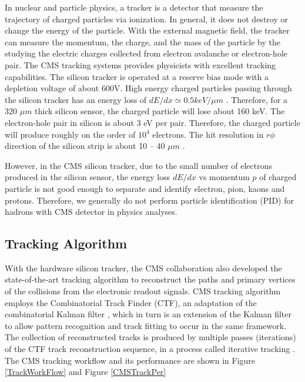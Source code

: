 In nuclear and particle physics, a tracker is a detector that measure the trajectory of charged particles via ionization. In general, it does not destroy or change the energy of the particle. With the external magnetic field, the tracker can measure the momentum, the charge, and the mass of the particle by the studying the electric charges collected from electron avalanche or electron-hole pair. The CMS tracking systems provides physicists with excellent tracking capabilities. The silicon tracker is operated at a reserve bias mode with a depletion voltage of about 600V. High energy charged particles passing through the silicon tracker has an energy loss of $dE/dx \simeq 0.5 keV/\mu m$ \cite{AlphaTheoEx}. Therefore, for a 320 $\mu m$ thick silicon sensor, the charged particle will lose about 160 keV. The electron-hole pair in silicon is about 3 eV per pair. Therefore, the charged particle will produce roughly on the order of $10^4$ electrons. The hit resolution in $r\phi$ direction of the silicon strip is about 10 -- 40 $\mu m$ \cite{CMSTrackComp}.

However, in the CMS silicon tracker, due to the small number of electrons produced in the silicon sensor, the energy loss $dE/dx$ vs momentum $p$ of charged particle is not good enough to separate and identify electron, pion, kaons and protons. Therefore, we generally do not perform particle identification (PID) for hadrons with CMS detector in physics analyses.  


\subsection{Tracking Algorithm}

With the hardware silicon tracker, the CMS collaboration also developed the state-of-the-art tracking algorithm to reconstruct the paths and primary vertices of the collisions from the electronic readout signals. CMS tracking algorithm employs the Combinatorial Track Finder (CTF), an adaptation of the combinatorial Kalman filter \cite{CMSTrack1,CMSTrack2,CMSTrack3}, which in turn is an extension of the Kalman filter \cite{Kalman} to allow pattern recognition and track fitting to occur in the same framework. The collection of reconstructed tracks is produced by multiple passes (iterations) of the CTF track reconstruction sequence, in a process called iterative tracking \cite{CMSTrackComp}. The CMS tracking workflow and its performance are shown in Figure \ref{TrackWorkFlow} and Figure \ref{CMSTrackPer}

